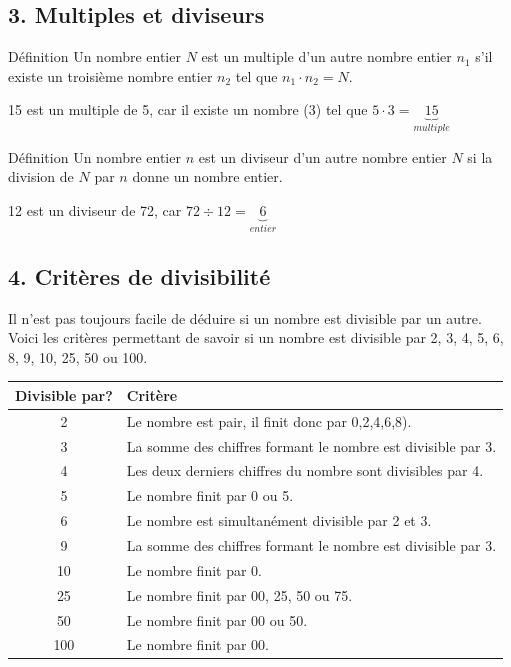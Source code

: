 \vfill
\subsection*{3. Multiples et diviseurs}

\begin{regle}{Définition}
Un nombre entier $N$ est un \textcolor{themeNO}{multiple} d'un autre nombre entier $n_1$ s'il existe un troisième nombre entier $n_2$ tel que $n_1\cdot n_2=N$.
\end{regle}

\begin{center}15 est un multiple de 5, car il existe un nombre (3) tel que $5\cdot 3=\underset{multiple}{\underbrace{15}}$\end{center}

\begin{regle}{Définition}
Un nombre entier $n$ est un \textcolor{themeNO}{diviseur} d'un autre nombre entier $N$ si la division de $N$ par $n$ donne un nombre entier. 
\end{regle}

\begin{center}12 est un diviseur de 72, car $72\div12=\underset{entier}{\underbrace{6}}$\end{center}

\vfill
\subsection*{4. Critères de divisibilité }

Il n'est pas toujours facile de déduire si un nombre est divisible par un autre. Voici les critères permettant de savoir si un nombre est divisible par 2, 3, 4, 5, 6, 8, 9, 10, 25, 50 ou 100.

\vspace{10pt}
\def\arraystretch{1.1}
\begin{tabularx}{\linewidth}{|c|X|}
\hline
Divisible par?&Critère\\\hline
2&Le nombre est pair, il finit donc par 0,2,4,6,8).\\\hline
3&La somme des chiffres formant le nombre est divisible par 3.\\\hline
4&Les deux derniers chiffres du nombre sont divisibles par 4.\\\hline
5&Le nombre finit par 0 ou 5.\\\hline
6&Le nombre est simultanément divisible par 2 et 3.\\\hline
9&La somme des chiffres formant le nombre est divisible par 3.\\\hline
10&Le nombre finit par 0.\\\hline
25&Le nombre finit par 00, 25, 50 ou 75.\\\hline
50&Le nombre finit par 00 ou 50.\\\hline
100&Le nombre finit par 00.\\\hline
\end{tabularx}
\def\arraystretch{1}

